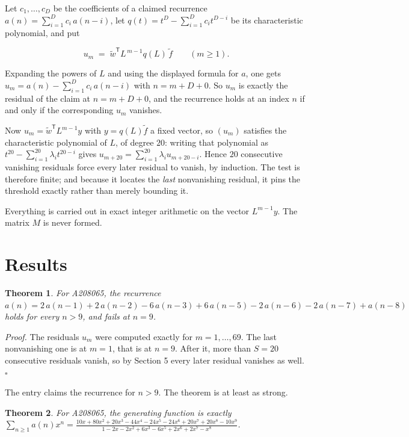 \documentclass[11pt]{article}
\newtheorem{theorem}{Theorem}
\theoremstyle{definition}
\begin{document}
Let $c_1,\dots,c_D$ be the coefficients of a claimed recurrence $a(n) = \sum_{i=1}^{D} c_i\,a(n-i)$, let $q(t) = t^{D} - \sum_{i=1}^{D} c_i t^{D-i}$ be its characteristic polynomial, and put

\[u_m \;=\; \tilde w^{\mathsf T} L^{\,m-1} q(L)\,\tilde f \qquad (m \ge 1).\]

Expanding the powers of $L$ and using the displayed formula for $a$, one gets $u_m = a(n) - \sum_{i=1}^{D} c_i\,a(n-i)$ with $n = m + D + 0$. So $u_m$ is exactly the residual of the claim at $n = m + D + 0$, and the recurrence holds at an index $n$ if and only if the corresponding $u_m$ vanishes.

Now $u_m = \tilde w^{\mathsf T} L^{m-1} y$ with $y = q(L)\tilde f$ a fixed vector, so $(u_m)$ satisfies the characteristic polynomial of $L$, of degree $20$: writing that polynomial as $t^{20} - \sum_{i=1}^{20} \lambda_i t^{20-i}$ gives $u_{m+20} = \sum_{i=1}^{20} \lambda_i u_{m+20-i}$. Hence $20$ consecutive vanishing residuals force every later residual to vanish, by induction. The test is therefore finite; and because it locates the {\itshape last} nonvanishing residual, it pins the threshold exactly rather than merely bounding it.

Everything is carried out in exact integer arithmetic on the vector $L^{m-1}y$. The matrix $M$ is never formed.

\section{Results}

\begin{theorem} For A208065, the recurrence $a(n) = 2\,a(n-1) + 2\,a(n-2) - 6\,a(n-3) + 6\,a(n-5) - 2\,a(n-6) - 2\,a(n-7) + a(n-8)$ holds for every $n > 9$, and fails at $n = 9$.\end{theorem}

{\itshape Proof.} The residuals $u_m$ were computed exactly for $m = 1,\dots,69$. The last nonvanishing one is at $m = 1$, that is at $n = 9$. After it, more than $S = 20$ consecutive residuals vanish, so by Section 5 every later residual vanishes as well. $\square$

The entry claims the recurrence for $n > 9$. The theorem is at least as strong.

\begin{theorem} For A208065, the generating function is exactly $\sum_{n\ge 1} a(n)x^n = \frac{10x + 80x^{2} + 20x^{3} - 44x^{4} - 24x^{5} - 24x^{6} + 20x^{7} + 20x^{8} - 10x^{9}}{1 - 2x - 2x^{2} + 6x^{3} - 6x^{5} + 2x^{6} + 2x^{7} - x^{8}}$.\end{theorem}
\end{document}
